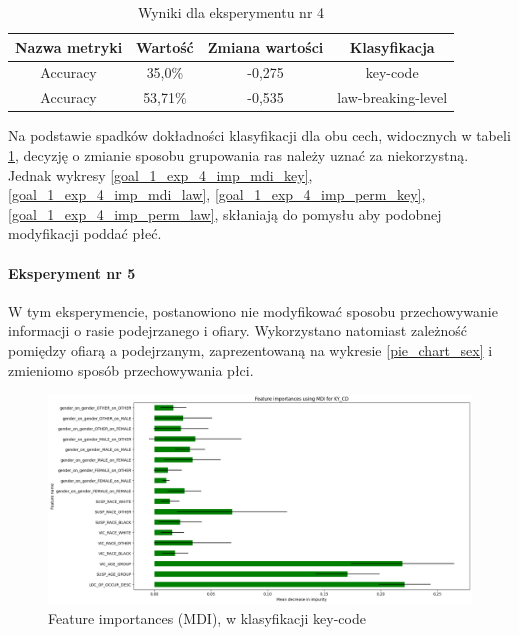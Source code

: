 \documentclass{classrep}
\begin{document}
{{{{                    \begin{table}
                    \centering
                     \begin{tabular}{|c|c|c|c|}
                            \hline
                          Nazwa metryki & Wartość & Zmiana wartości & Klasyfikacja \\ \hline
                            Accuracy &  35,0\% & -0,275 & key-code\\ \hline
                            Accuracy &  53,71\% & -0,535 & law-breaking-level\\ \hline
                        \end{tabular}
                        \caption{Wyniki dla eksperymentu nr 4}
                        \label{goal_1_exp_4_results}
                     \end{table}
                     \FloatBarrier
                     Na podstawie spadków dokładności klasyfikacji dla obu cech, widocznych w tabeli \ref{goal_1_exp_4_results}, decyzję o zmianie sposobu grupowania ras należy uznać za niekorzystną. Jednak wykresy \ref{goal_1_exp_4_imp_mdi_key}, \ref{goal_1_exp_4_imp_mdi_law}, \ref{goal_1_exp_4_imp_perm_key}, \ref{goal_1_exp_4_imp_perm_law}, skłaniają do pomysłu aby podobnej modyfikacji poddać płeć.
                }
                \paragraph{Eksperyment nr 5}{
                    W tym eksperymencie, postanowiono nie modyfikować sposobu przechowywanie informacji o rasie podejrzanego i ofiary. Wykorzystano natomiast zależność pomiędzy ofiarą a podejrzanym, zaprezentowaną na wykresie \ref{pie_chart_sex} i zmieniomo sposób przechowywania płci.
                    \begin{figure}[!htbp]
                        \centering
                        \includegraphics[width=\textwidth]{img/5.1.3/5/Feature importances using MDI for KY_CD.png}
                        \caption{Feature importances (MDI), w klasyfikacji key-code}
                        \label{goal_1_exp_5_imp_mdi_key}
                    \end{figure}
                    
}}}}
\end{document}
